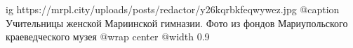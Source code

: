  
 
 
 
 

\ifcmt
  ig https://mrpl.city/uploads/posts/redactor/y26kqrbkfeqwywez.jpg
	@caption Учительницы женской Мариинской гимназии. Фото из фондов Мариупольского краеведческого музея
  @wrap center
  @width 0.9
\fi
